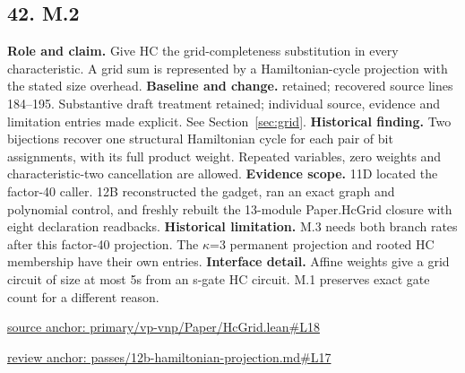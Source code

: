 \documentclass[11pt,letterpaper]{article}
\theoremstyle{definition}\newtheorem{definition}[theorem]{Definition}\newtheorem{example}[theorem]{Example}
\theoremstyle{remark}\newtheorem{remark}[theorem]{Remark}
\begin{document}
\subsection*{42. M.2}
\textbf{Role and claim.} Give HC the grid-completeness substitution in every characteristic. A grid sum is represented by a Hamiltonian-cycle projection with the stated size overhead.
\textbf{Baseline and change.} retained; recovered source lines 184--195. Substantive draft treatment retained; individual source, evidence and limitation entries made explicit. See Section~\ref{sec:grid}.
\textbf{Historical finding.} Two bijections recover one structural Hamiltonian cycle for each pair of bit assignments, with its full product weight. Repeated variables, zero weights and characteristic-two cancellation are allowed.
\textbf{Evidence scope.} 11D located the factor-40 caller. 12B reconstructed the gadget, ran an exact graph and polynomial control, and freshly rebuilt the 13-module Paper.HcGrid closure with eight declaration readbacks.
\textbf{Historical limitation.} M.3 needs both branch rates after this factor-40 projection. The \ensuremath{\kappa}=3 permanent projection and rooted HC membership have their own entries.
\textbf{Interface detail.} Affine weights give a grid circuit of size at most 5s from an s-gate HC circuit. M.1 preserves exact gate count for a different reason.
\par\href{https://github.com/nousentllc/VP-VNP-Review/blob/8a7976933b6b2b4ffda1ad3a0dfb5fc6b6f023e8/primary/vp-vnp/Paper/HcGrid.lean\#L18}{source anchor: primary/vp-vnp/Paper/HcGrid.lean\#L18}
\par\href{https://github.com/nousentllc/VP-VNP-Review/blob/8a7976933b6b2b4ffda1ad3a0dfb5fc6b6f023e8/passes/12b-hamiltonian-projection.md\#L17}{review anchor: passes/12b-hamiltonian-projection.md\#L17}
\goodbreak
\end{document}
